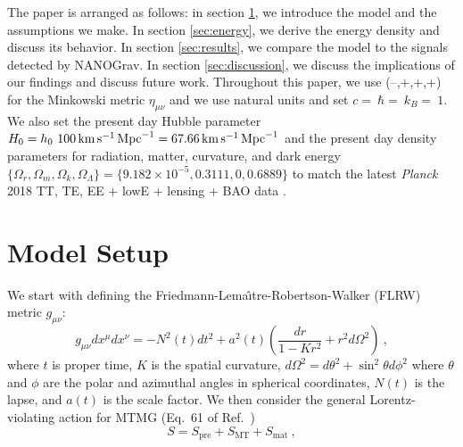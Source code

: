 \documentclass[prd,twocolumn,aps,psfig,nofootinbib,nobibnotes,superscriptaddress,preprintnumbers,times]{revtex4-2}
\newcommand{\s}{\,{\rm s}}
\newcommand{\km}{\,{\rm km}}
\newcommand{\Mpc}{\,{\rm Mpc}}
\begin{document}
The paper is arranged as follows: in section \ref{sec:setup}, we introduce the model and the assumptions we make. In section \ref{sec:energy}, we derive the energy density and discuss its behavior. In section \ref{sec:results}, we compare the model to the signals detected by NANOGrav. In section \ref{sec:discussion}, we discuss the implications of our findings and discuss future work. Throughout this paper, we use  (--,+,+,+) for the Minkowski metric $\eta_{\mu\nu}$ and we use natural units and set $c = $$\ \hbar = $$\ k_B = $$\ 1$. We also set the present day Hubble parameter $H_0 = h_0\ 100 \km \s^{-1}\Mpc^{-1} = 67.66 \km \s^{-1}\Mpc^{-1}$ and the present day density parameters for radiation, matter, curvature, and dark energy $\{\Omega_r, \Omega_m, \Omega_k, \Omega_\Lambda\} = \{9.182\times10^{-5},0.3111,0,0.6889\}$ to match the latest \textit{Planck} 2018 TT, TE, EE + lowE + lensing + BAO data \cite{Planck:2018vyg}.

\section{Model Setup}\label{sec:setup}
We start with defining the Friedmann-Lema\^{\i}tre-Robertson-Walker (FLRW) metric $g_{\mu\nu}$:
\begin{equation}\label{eqn:metric}
    g_{\mu\nu}dx^{\mu} dx^{\nu} = -N^2(t)dt^2 +a^2(t)\left(\frac{dr}{1-Kr^2} + r^2 d\Omega^2\right)\ ,
\end{equation}
where $t$ is proper time, $K$ is the spatial curvature, $d\Omega^2 = d\theta^2 + \sin^2\theta d\phi^2$ where $\theta$ and $\phi$ are the polar and azimuthal angles in spherical coordinates, $N(t)$ is the lapse, and $a(t)$ is the scale factor. We then consider the general Lorentz-violating action for MTMG (Eq.\ 61 of Ref.\ \cite{DeFelice:2015moy})
\begin{equation}\label{eqn:action}
    S = S_{\text{pre}} + S_{\text{MT}} + S_{\text{mat}}\ ,
\end{equation}
\end{document}
